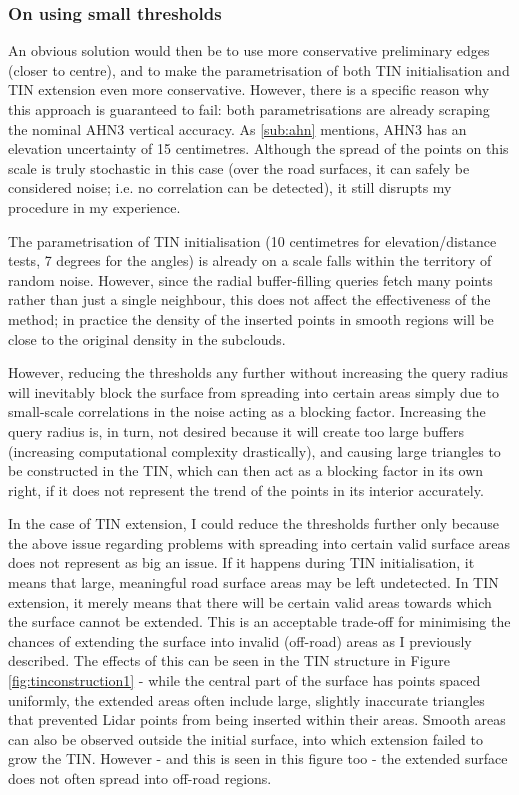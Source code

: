 \subsubsection{On using small thresholds}

An obvious solution would then be to use more conservative preliminary edges (closer to centre), and to make the parametrisation of both TIN initialisation and TIN extension even more conservative. However, there is a specific reason why this approach is guaranteed to fail: both parametrisations are already scraping the nominal AHN3 vertical accuracy. As \ref{sub:ahn} mentions, AHN3 has an elevation uncertainty of 15 centimetres. Although the spread of the points on this scale is truly stochastic in this case (over the road surfaces, it can safely be considered noise; i.e. no correlation can be detected), it still disrupts my procedure in my experience.

The parametrisation of TIN initialisation (10 centimetres for elevation/distance tests, 7 degrees for the angles) is already on a scale falls within the territory of random noise. However, since the radial buffer-filling queries fetch many points rather than just a single neighbour, this does not affect the effectiveness of the method; in practice the density of the inserted points in smooth regions will be close to the original density in the subclouds.

However, reducing the thresholds any further without increasing the query radius will inevitably block the surface from spreading into certain areas simply due to small-scale correlations in the noise acting as a blocking factor. Increasing the query radius is, in turn, not desired because it will create too large buffers (increasing computational complexity drastically), and causing large triangles to be constructed in the TIN, which can then act as a blocking factor in its own right, if it does not represent the trend of the points in its interior accurately.

In the case of TIN extension, I could reduce the thresholds further only because the above issue regarding problems with spreading into certain valid surface areas does not represent as big an issue. If it happens during TIN initialisation, it means that large, meaningful road surface areas may be left undetected. In TIN extension, it merely means that there will be certain valid areas towards which the surface cannot be extended. This is an acceptable trade-off for minimising the chances of extending the surface into invalid (off-road) areas as I previously described. The effects of this can be seen in the TIN structure in Figure \ref{fig:tinconstruction1} - while the central part of the surface has points spaced uniformly, the extended areas often include large, slightly inaccurate triangles that prevented Lidar points from being inserted within their areas. Smooth areas can also be observed outside the initial surface, into which extension failed to grow the TIN. However - and this is seen in this figure too - the extended surface does not often spread into off-road regions.

